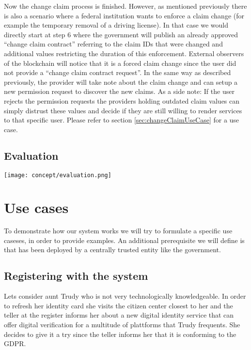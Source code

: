 Now the change claim process is finished. However, as mentioned previously there is also a scenario where a federal institution wants to enforce a claim change (for example the temporary removal of a driving license). In that case we would directly start at step 6 where the government will publish an already approved “change claim contract” referring to the claim IDs that were changed and additional values restricting the duration of this enforcement. External observers of the blockchain will notice that it is a forced claim change since the user did not provide a “change claim contract request”. In the same way as described previously, the provider will take note about the claim change and can setup a new permission request to discover the new claims. As a side note: If the user rejects the permission requests the providers holding outdated claim values can simply distrust these values and decide if they are still willing to render services to that specific user. Please refer to section \ref{sec:changeClaimUseCase} for a use case.

\subsection{Evaluation}

\texttt{[image: concept/evaluation.png]}
 
\section{Use cases}
To demonstrate how our system works we will try to formulate a specific use caseses, in order to provide examples. An additional prerequisite we will define is that \projectName{} has been deployed by a centrally trusted entity like the government.

\subsection{Registering with the system}
\label{ssec:registerWithSystem}
Lets consider aunt Trudy who is not very technologically knowledgeable. In order to refresh her identity card she visits the citizen center closest to her and the teller at the register informs her about a new digital identity service that can offer digital verification for a multitude of plattforms that Trudy frequents. She decides to give it a try since the teller informs her that it is conforming to the GDPR\cite{gdpr}.

